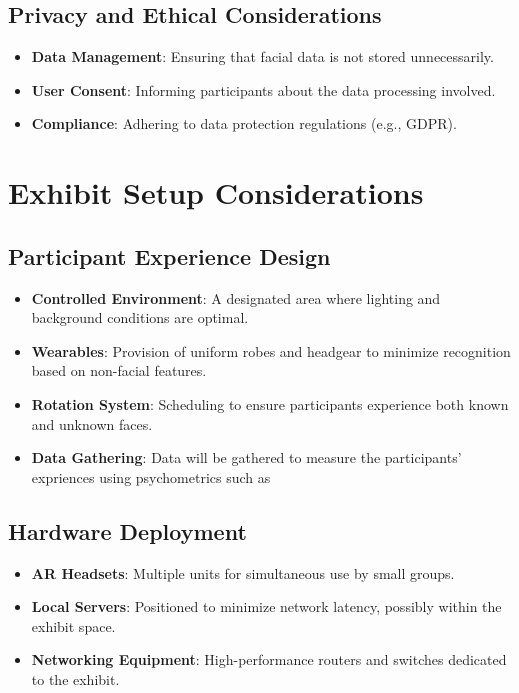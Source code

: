 \documentclass{article}
\begin{document}
\subsection{Privacy and Ethical Considerations}

\begin{itemize}
    \item \textbf{Data Management}: Ensuring that facial data is not stored unnecessarily.
    \item \textbf{User Consent}: Informing participants about the data processing involved.
    \item \textbf{Compliance}: Adhering to data protection regulations (e.g., GDPR).
\end{itemize}

\section{Exhibit Setup Considerations}

\subsection{Participant Experience Design}

\begin{itemize}
    \item \textbf{Controlled Environment}: A designated area where lighting and background conditions are optimal.
    \item \textbf{Wearables}: Provision of uniform robes and headgear to minimize recognition based on non-facial features.
    \item \textbf{Rotation System}: Scheduling to ensure participants experience both known and unknown faces.
    \item \textbf{Data Gathering}: Data will be gathered to measure the participants' expriences using psychometrics such as \cite{degutis_2014} \cite{duchaine_2006}
\end{itemize}

\subsection{Hardware Deployment}

\begin{itemize}
    \item \textbf{AR Headsets}: Multiple units for simultaneous use by small groups.
    \item \textbf{Local Servers}: Positioned to minimize network latency, possibly within the exhibit space.
    \item \textbf{Networking Equipment}: High-performance routers and switches dedicated to the exhibit.
\end{itemize}
\end{document}
